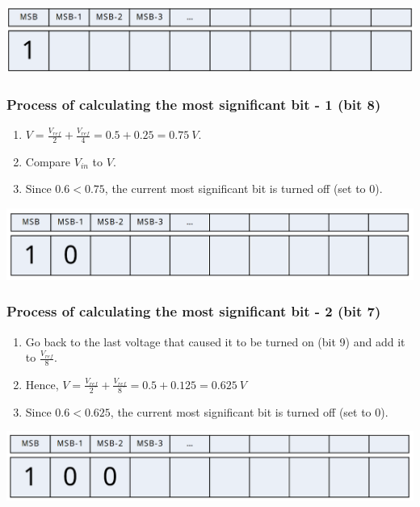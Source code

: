 \documentclass[11pt]{article}
\begin{document}
\begin{center}
\includegraphics[width=.9\linewidth]{./images/a-d-converter-msb-calculation-process.png}
\end{center}
\subsubsection{Process of calculating the most significant bit - 1 (bit 8)}
\label{sec:org81696a9}
\begin{enumerate}
\item \(V = \frac{V_{ref}}{2} + \frac{V_{ref}}{4} = 0.5 + 0.25 = \qty{0.75}{V}\).
\item Compare \(V_{in}\) to \(V\).
\item Since \(0.6 < 0.75\), the current most significant bit is turned off (set to 0).
\end{enumerate}

\begin{center}
\includegraphics[width=.9\linewidth]{./images/a-d-converter-msb-1-calculation-process.png}
\end{center}

 \newpage
\subsubsection{Process of calculating the most significant bit - 2 (bit 7)}
\label{sec:orgede714f}
\begin{enumerate}
\item Go back to the last voltage that caused it to be turned on (bit 9) and add it to \(\frac{V_{ref}}{8}\).
\item Hence, \(V = \frac{V_{ref}}{2} + \frac{V_{ref}}{8} = 0.5 + 0.125 = \qty{0.625}{V}\)
\item Since \(0.6 < 0.625\), the current most significant bit is turned off (set to 0).
\end{enumerate}

\begin{center}
\includegraphics[width=.9\linewidth]{./images/a-d-converter-msb-2-calculation-process.png}
\end{center}
\end{document}
